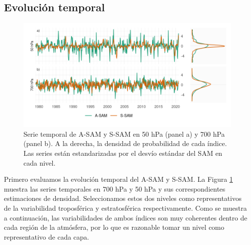 \documentclass[12pt,oneside,a4paper]{reedthesis}
\begin{document}
\hypertarget{temporal}{%
\subsection{Evolución temporal}\label{temporal}}



\begin{figure}

{\centering \includegraphics{figures/30-sam/asymsam-timeseries-1} 

}

\caption{Serie temporal de A-SAM y S-SAM en 50 hPa (panel a) y 700 hPa (panel b). A la derecha, la densidad de probabilidad de cada índice. Las series están estandarizadas por el desvío estándar del SAM en cada nivel.}\label{fig:asymsam-timeseries}
\end{figure}

Primero evaluamos la evolución temporal del A-SAM y S-SAM.
La Figura \ref{fig:asymsam-timeseries} muestra las series temporales en 700 hPa y 50 hPa y sus correspondientes estimaciones de densidad.
Seleccionamos estos dos niveles como representativos de la variabilidad troposférica y estratosférica respectivamente.
Como se muestra a continuación, las variabilidades de ambos índices son muy coherentes dentro de cada región de la atmósfera, por lo que es razonable tomar un nivel como representativo de cada capa.
\end{document}
